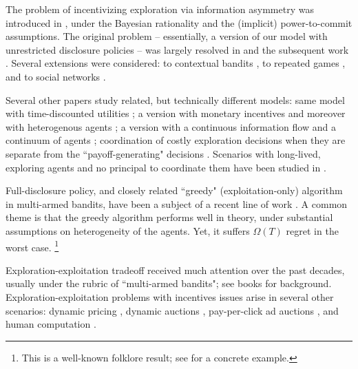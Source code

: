 The problem of incentivizing exploration via information asymmetry was introduced in \cite{Kremer-JPE14}, under the Bayesian rationality and the (implicit) power-to-commit assumptions. The original problem -- essentially, a version of our model with unrestricted disclosure policies -- was largely resolved in \cite{Kremer-JPE14} and the subsequent work \cite{ICexploration-ec15,ICexplorationGames-ec16}. Several extensions were considered: to contextual bandits \cite{ICexploration-ec15}, to repeated games
\cite{ICexplorationGames-ec16}, and to social networks \cite{Bahar-ec16}.

Several other papers study related, but technically different models: same model with time-discounted utilities \cite{Bimpikis-exploration-ms17}; a version with monetary incentives \cite{Frazier-ec14} and moreover with heterogenous agents \cite{Kempe-colt18}; a version with a continuous information flow and a continuum of agents \cite{Che-13}; coordination of costly exploration decisions when they are separate from the ``payoff-generating" decisions \cite{Bobby-Glen-ec16,Annie-ec18-traps,Liang-ec18}. Scenarios with long-lived, exploring agents and no principal to coordinate them have been studied in \cite{Bolton-econometrica99,Keller-econometrica05}.

Full-disclosure policy, and closely related ``greedy" (exploitation-only) algorithm in multi-armed bandits, have been a subject of a recent line of work \cite{Sven-aistats18,kannan2018smoothed,bastani2017exploiting,externalities-colt18}.
A common theme is that the greedy algorithm performs well in theory, under  substantial assumptions on heterogeneity of the agents. Yet, it suffers $\Omega(T)$ regret in the worst case.%
\footnote{This is a well-known folklore result; \eg see \cite{CompetingBandits-itcs18} for a concrete example.}

Exploration-exploitation tradeoff received much attention over the past decades, usually under the rubric of ``multi-armed bandits"; see books \cite{CesaBL-book,Bubeck-survey12,Gittins-book11} for background.
Exploration-exploitation problems with incentives issues arise in several other scenarios: dynamic pricing
    \cite{KleinbergL03,BZ09,BwK-focs13},
dynamic auctions
    \cite{AtheySegal-econometrica13,DynPivot-econometrica10,Kakade-pivot-or13},
pay-per-click ad auctions
    \cite{MechMAB-ec09,DevanurK09,Transform-ec10-jacm},
and human computation
    \cite{RepeatedPA-ec14,Ghosh-itcs13,Krause-www13}.
